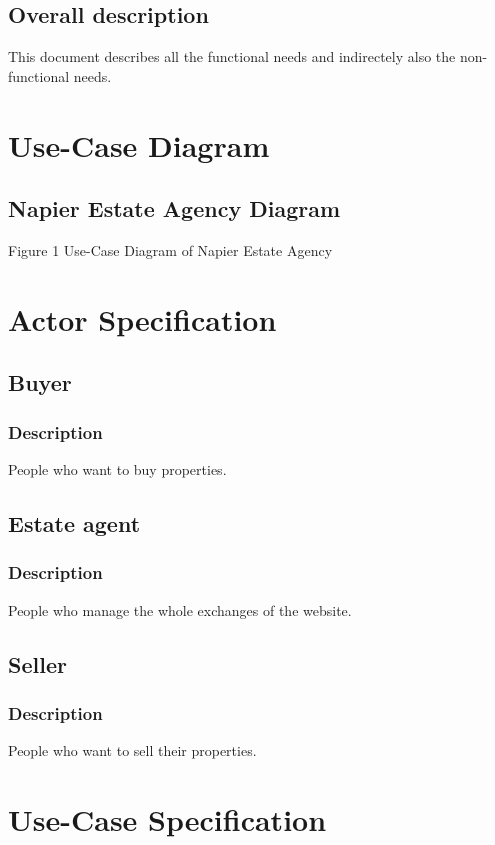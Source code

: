 \documentclass[a4paper,12pt]{article}
\begin{document}
\subsection{Overall description}
This document describes all the functional needs and indirectely also the non-functional needs.


\section{Use-Case Diagram}

\subsection{Napier Estate Agency Diagram}
Figure 1 Use-Case Diagram of Napier Estate Agency


\section{Actor Specification}

\subsection{Buyer}
\subsubsection{Description}
People who want to buy properties.

\subsection{Estate agent}
\subsubsection{Description}
People who manage the whole exchanges of the website.

\subsection{Seller}
\subsubsection{Description}
People who want to sell their properties.


\section{Use-Case Specification}
\end{document}
